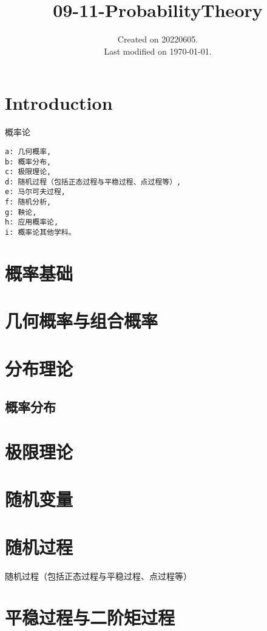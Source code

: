 \documentclass[UTF8]{../09-Mathematics}
\begin{document}
\title{09-11-ProbabilityTheory}
\date{Created on 20220605.\\   Last modified on \today.}
\maketitle
\tableofcontents


\chapter{Introduction}

概率论

\begin{lstlisting}
a: 几何概率, 
b: 概率分布, 
c: 极限理论, 
d: 随机过程（包括正态过程与平稳过程、点过程等）, 
e: 马尔可夫过程, 
f: 随机分析, 
g: 鞅论, 
h: 应用概率论, 
i: 概率论其他学科。

\end{lstlisting}



\chapter{概率基础}
\chapter{几何概率与组合概率}

\chapter{分布理论}
    \section{概率分布}


\chapter{极限理论}


\chapter{随机变量}
\chapter{随机过程}
随机过程（包括正态过程与平稳过程、点过程等）


\chapter{平稳过程与二阶矩过程}
\end{document}
